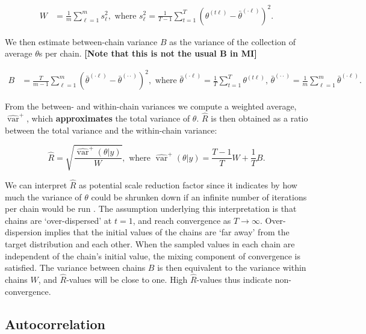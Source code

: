 \documentclass[Royal,times,sageh]{sagej}
\begin{document}
\begin{align*}
W&=\frac{1}{m} \sum_{\ell=1}^{m} s_{\ell}^{2}, \text { where } s_{\ell}^{2}=\frac{1}{T-1} \sum_{t=1}^{T}\left(\theta^{(t \ell)}-\bar{\theta}^{(\cdot \ell)}\right)^{2}. 
\end{align*}

\noindent We then estimate between-chain variance \(B\) as the variance of the collection of average \(\theta\)s per chain. \textbf{{[}Note that this is not the usual B in MI{]}}

\begin{align*}
B&=\frac{T}{m-1} \sum_{\ell=1}^{m}\left(\bar{\theta}^{(\cdot \ell)}-\bar{\theta}^{(\cdot \cdot)}\right)^{2}, \text { where } \bar{\theta}^{(\cdot \ell)}=\frac{1}{T} \sum_{t=1}^{T} \theta^{(t \ell)} \text{, } \bar{\theta}^{(\cdot \cdot)}=\frac{1}{m} \sum_{\ell=1}^{m} \bar{\theta}^{(\cdot \ell)}. 
\end{align*}

\noindent From the between- and within-chain variances we compute a weighted average, \(\widehat{\operatorname{var}}^{+}\), which \textbf{approximates} the total variance of \(\theta\). \(\widehat{R}\) is then obtained as a ratio between the total variance and the within-chain variance:

\begin{equation*}
\widehat{R}=\sqrt{\frac{\widehat{\operatorname{var}}^{+}(\theta | y)}{W}},
\text{ where } \widehat{\operatorname{var}}^{+}(\theta | y)=\frac{T-1}{T} W+\frac{1}{T} B.
\end{equation*}

We can interpret \(\widehat{R}\) as potential scale reduction factor since it indicates by how much the variance of \(\theta\) could be shrunken down if an infinite number of iterations per chain would be run \citep{gelm92}. The assumption underlying this interpretation is that chains are `over-dispersed' at \(t=1\), and reach convergence as \(T \to \infty\). Over-dispersion implies that the initial values of the chains are `far away' from the target distribution and each other. When the sampled values in each chain are independent of the chain's initial value, the mixing component of convergence is satisfied. The variance between chains \(B\) is then equivalent to the variance within chains \(W\), and \(\widehat{R}\)-values will be close to one. High \(\widehat{R}\)-values thus indicate non-convergence.

\hypertarget{autocorrelation}{%
\subsection{Autocorrelation}\label{autocorrelation}}
\end{document}
